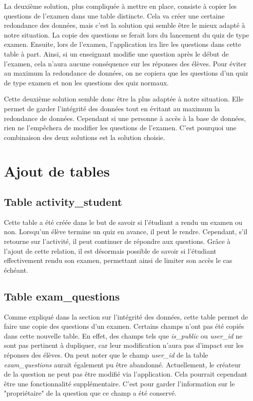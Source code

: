 La deuxième solution, plus compliquée à mettre en place, consiste à copier les questions de l'examen dans une table distincte. Cela va créer une certaine redondance des données, mais c'est la solution qui semble être le mieux adapté à notre situation. La copie des questions se ferait lors du lancement du quiz de type examen. Ensuite, lors de l'examen, l'application ira lire les questions dans cette table à part. Ainsi, si un enseignant modifie une question après le début de l'examen, cela n'aura aucune conséquence sur les réponses des élèves. Pour éviter au maximum la redondance de données, on ne copiera que les questions d'un quiz de type examen et non les questions des quiz normaux.

Cette deuxième solution semble donc être la plus adaptée à notre situation. Elle permet de garder l'intégrité des données tout en évitant au maximum la redondance de données. Cependant si une personne à accès à la base de données, rien ne l'empêchera de modifier les questions de l'examen. C'est pourquoi une combinaison des deux solutions est la solution choisie.

\section{Ajout de tables}

\subsection{Table activity\_student}
Cette table a été créée dans le but de savoir si l'étudiant a rendu un examen ou non. Lorsqu'un élève termine un quiz en avance, il peut le rendre. Cependant, s'il retourne sur l'activité, il peut continuer de répondre aux questions. Grâce à l'ajout de cette relation, il est désormais possible de savoir si l'étudiant effectivement rendu son examen, permettant ainsi de limiter son accès le cas échéant.

\subsection{Table exam\_questions}
Comme expliqué dans la section sur l'intégrité des données, cette table permet de faire une copie des questions d'un examen. Certains champs n'ont pas été copiés dans cette nouvelle table. En effet, des champs tels que \emph{is\_public} ou \emph{user\_id} ne sont pas pertinent à dupliquer, car leur modification n'aura pas d'impact sur les réponses des élèves. On peut noter que le champ \emph{user\_id} de la table \emph{exam\_questions} aurait également pu être abandonné. Actuellement, le créateur de la question ne peut pas être modifié via l'application. Cela pourrait cependant être une fonctionnalité supplémentaire. C'est pour garder l'information sur le "propriétaire" de la question que ce champ a été conservé.

